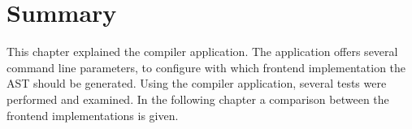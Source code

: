 
\section{Summary}

This chapter explained the compiler application. The application offers several command line parameters, to configure with which frontend implementation the AST should be generated. Using the compiler application, several tests were performed and examined. In the following chapter a comparison between the frontend implementations is given. 
